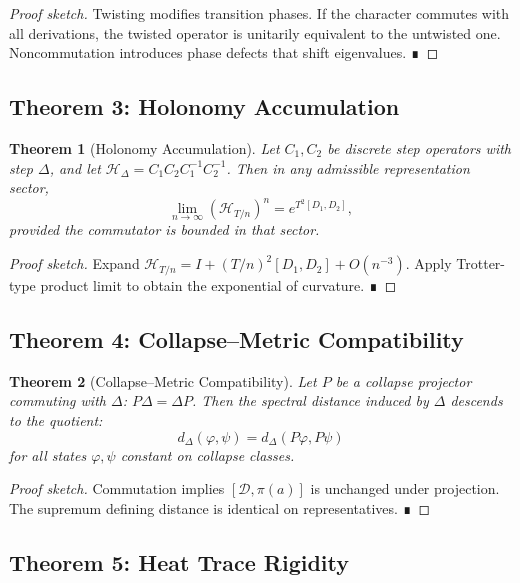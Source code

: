 \documentclass[12pt, oneside]{article}
\newtheorem{theorem}{Theorem}[section]
\begin{document}
\begin{proof}[Proof sketch]
Twisting modifies transition phases. If the character commutes with all derivations, the twisted operator is unitarily equivalent to the untwisted one. Noncommutation introduces phase defects that shift eigenvalues. ∎
\end{proof}

\subsection{Theorem 3: Holonomy Accumulation}

\begin{theorem}[Holonomy Accumulation]
Let $C_1, C_2$ be discrete step operators with step $\Delta$, and let $\mathcal{H}_\Delta = C_1 C_2 C_1^{-1} C_2^{-1}$. Then in any admissible representation sector,
\[
\lim_{n \to \infty} (\mathcal{H}_{T/n})^n = e^{T^2 [D_1, D_2]},
\]
provided the commutator is bounded in that sector.
\end{theorem}

\begin{proof}[Proof sketch]
Expand $\mathcal{H}_{T/n} = I + (T/n)^2 [D_1, D_2] + O(n^{-3})$. Apply Trotter-type product limit to obtain the exponential of curvature. ∎
\end{proof}

\subsection{Theorem 4: Collapse–Metric Compatibility}

\begin{theorem}[Collapse–Metric Compatibility]
Let $P$ be a collapse projector commuting with $\Delta$: $P\Delta = \Delta P$. Then the spectral distance induced by $\Delta$ descends to the quotient:
\[
d_\Delta(\varphi, \psi) = d_\Delta(P\varphi, P\psi)
\]
for all states $\varphi,\psi$ constant on collapse classes.
\end{theorem}

\begin{proof}[Proof sketch]
Commutation implies $[\mathcal{D}, \pi(a)]$ is unchanged under projection. The supremum defining distance is identical on representatives. ∎
\end{proof}

\subsection{Theorem 5: Heat Trace Rigidity}
\end{document}
